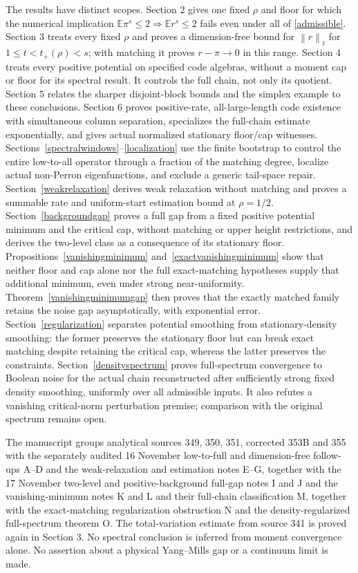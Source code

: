 \documentclass[11pt]{article}
\newcommand{\E}{\mathbb E}
\newcommand{\norm}[1]{\left\|#1\right\|}
\begin{document}
The results have distinct scopes. Section 2 gives one fixed $\rho$ and floor for which the numerical implication $\E\pi^s\leq2\Rightarrow\E r^s\leq2$ fails even under all of \eqref{admissible}. Section 3 treats every fixed $\rho$ and proves a dimension-free bound for $\norm r_t$ for $1\leq t<t_+(\rho)<s$; with matching it proves $r-\pi\to0$ in this range. Section 4 treats every positive potential on specified code algebras, without a moment cap or floor for its spectral result. It controls the full chain, not only its quotient. Section 5 relates the sharper disjoint-block bounds and the simplex example to these conclusions. Section 6 proves positive-rate, all-large-length code existence with simultaneous column separation, specializes the full-chain estimate exponentially, and gives actual normalized stationary floor/cap witnesses. Sections~\ref{spectralwindows}--\ref{localization} use the finite bootstrap to control the entire low-to-all operator through a fraction of the matching degree, localize actual non-Perron eigenfunctions, and exclude a generic tail-space repair. Section~\ref{weakrelaxation} derives weak relaxation without matching and proves a summable rate and uniform-start estimation bound at $\rho=1/2$. Section~\ref{backgroundgap} proves a full gap from a fixed positive potential minimum and the critical cap, without matching or upper height restrictions, and derives the two-level class as a consequence of its stationary floor. Propositions~\ref{vanishingminimum} and~\ref{exactvanishingminimum} show that neither floor and cap alone nor the full exact-matching hypotheses supply that additional minimum, even under strong near-uniformity. Theorem~\ref{vanishingminimumgap} then proves that the exactly matched family retains the noise gap asymptotically, with exponential error. Section~\ref{regularization} separates potential smoothing from stationary-density smoothing: the former preserves the stationary floor but can break exact matching despite retaining the critical cap, whereas the latter preserves the constraints. Section~\ref{densityspectrum} proves full-spectrum convergence to Boolean noise for the actual chain reconstructed after sufficiently strong fixed density smoothing, uniformly over all admissible inputs. It also refutes a vanishing critical-norm perturbation premise; comparison with the original spectrum remains open.

The manuscript groups analytical sources 349, 350, 351, corrected 353B and 355 with the separately audited 16 November low-to-full and dimension-free follow-ups A--D and the weak-relaxation and estimation notes E--G, together with the 17 November two-level and positive-background full-gap notes I and J and the vanishing-minimum notes K and L and their full-chain classification M, together with the exact-matching regularization obstruction N and the density-regularized full-spectrum theorem O. The total-variation estimate from source 341 is proved again in Section 3. No spectral conclusion is inferred from moment convergence alone. No assertion about a physical Yang--Mills gap or a continuum limit is made.
\end{document}
